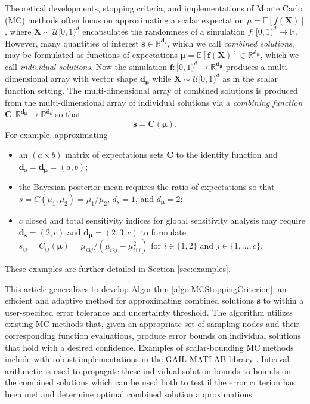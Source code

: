 \documentclass[graybox]{svmult}
\begin{document}
Theoretical developments, stopping criteria, and implementations of Monte Carlo (MC) methods often focus on approximating a scalar expectation $\mu = \mathbb{E}[f(\boldsymbol{X})]$, where $\boldsymbol{X} \sim \mathcal{U}[0,1)^d$ encapsulates the randomness of a simulation $f: [0,1)^d \to \mathbb{R}$. However, many quantities of interest $\boldsymbol{s} \in \mathbb{R}^{\boldsymbol{d}_{\boldsymbol{s}}}$, which we call \emph{combined solutions}, may be formulated as functions of expectations $\boldsymbol{\mu} = \mathbb{E}[\boldsymbol{f}(\boldsymbol{X})] \in \mathbb{R}^{\boldsymbol{d}_{\boldsymbol{\mu}}}$, which we call \emph{individual solutions}. Now the simulation $\boldsymbol{f}: [0,1)^{d} \to \mathbb{R}^{\boldsymbol{d}_{\boldsymbol{\mu}}}$ produces a multi-dimensional array with vector shape $\boldsymbol{d}_{\boldsymbol{\mu}}$ while $\boldsymbol{X} \sim \mathcal{U}[0,1)^d$ as in the scalar function setting. The multi-dimensional array of combined solutions is produced from the multi-dimensional array of individual solutions via a \emph{combining function} $\boldsymbol{C}: \mathbb{R}^{\boldsymbol{d}_{\boldsymbol{\mu}}} \to \mathbb{R}^{\boldsymbol{d}_{\boldsymbol{s}}}$ so that 
\begin{equation}
    \boldsymbol{s} = \boldsymbol{C}(\boldsymbol{\mu}).
    \label{eq:comb_from_indv}
\end{equation}
For example, approximating
\begin{itemize}
    \item an $(a \times b)$ matrix of expectations sets $\boldsymbol{C}$ to the identity function and $\boldsymbol{d}_{\boldsymbol{s}} = \boldsymbol{d}_{\boldsymbol{\mu}} = (a,b)$;
    \item the Bayesian posterior mean requires the ratio of expectations so that $s = C(\mu_1,\mu_2) = \mu_1/\mu_2$, $d_s = 1$, and $d_{\boldsymbol{\mu}} = 2$;
    \item $c$ closed and total sensitivity indices for global sensitivity analysis may require $\boldsymbol{d}_{\boldsymbol{s}} = (2,c)$ and $\boldsymbol{d}_{\boldsymbol{\mu}} = (2,3,c)$ to formulate $s_{ij} = C_{ij}(\boldsymbol{\mu}) =  \mu_{i3j}/(\mu_{i2j}-\mu_{i1j}^2)$ for $i \in \{1,2\}$ and $j \in \{1,\dots,c\}$.
\end{itemize}
These examples are further detailed in Section \ref{sec:examples}.

This article generalizes \cite{adaptive_qmc} to develop Algorithm \ref{algo:MCStoppingCriterion}, an efficient and adaptive method for approximating combined solutions $\boldsymbol{s}$ to within a user-specified error tolerance and uncertainty threshold. The algorithm utilizes existing MC  methods that, given an appropriate set of sampling nodes and their corresponding function evaluations, produce error bounds on individual solutions that hold with a desired confidence. Examples of scalar-bounding MC methods include \cite{cubmcg,cubqmclattice,cubqmcsobol,cubqmcbayes_thesis,cubqmcbayeslattice} with robust implementations in the GAIL MATLAB library \cite{ChoEtal21a,hickernell2018monte}. Interval arithmetic is used to propagate these individual solution bounds to bounds on the combined solutions which can be used both to test if the error criterion has been met and determine optimal combined solution approximations. 
\end{document}
